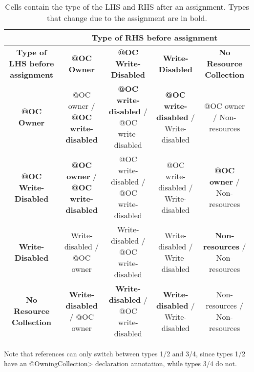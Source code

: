 \begin{table}[ht]
    \centering
    \caption{Cells contain the type of the LHS and RHS after an
    assignment.  Types that change due to the assignment are in bold.}
    \begin{tabular}{|c|c|c|c|c|}
        \hline
        & \multicolumn{4}{c|}{Type of RHS before assignment} \\
        \hline
        \textbf{Type of LHS before assignment} & \textbf{@OC Owner} & \textbf{@OC Write-Disabled} & \textbf{Write-Disabled} & \textbf{No Resource Collection} \\ \hline
        \textbf{@OC Owner} & @OC owner / \textbf{@OC write-disabled} & \textbf{@OC write-disabled} / @OC write-disabled & \textbf{@OC write-disabled} / Write-disabled & @OC owner / Non-resources \\ \hline
        \textbf{@OC Write-Disabled} & \textbf{@OC owner} / \textbf{@OC write-disabled} & @OC write-disabled / @OC write-disabled & @OC write-disabled / Write-disabled & \textbf{@OC owner} / Non-resources \\ \hline
        \textbf{Write-Disabled} & Write-disabled / @OC owner & Write-disabled / @OC write-disabled & Write-disabled / Write-disabled & \textbf{Non-resources} / Non-resources \\ \hline
        \textbf{No Resource Collection} & \textbf{Write-disabled} / @OC owner & \textbf{Write-disabled} / @OC write-disabled & \textbf{Write-disabled} / Write-disabled  & Non-resources / Non-resources \\ \hline
    \end{tabular}
    \label{tab:abstract_domain_results_with_errors}
\end{table}

Note that references can only switch between types 1/2 and 3/4, since types 1/2 have an \<@OwningCollection> declaration annotation, while types 3/4 do not.

